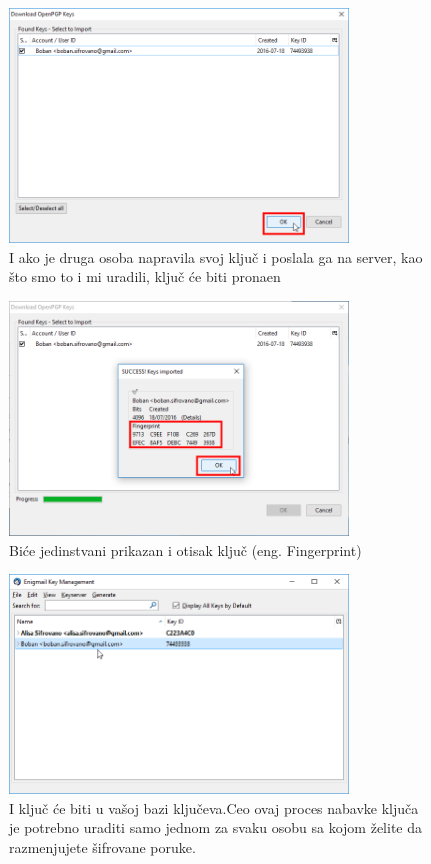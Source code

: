 \documentclass[a4paper,11pt]{article}
\begin{document}
\begin{figure}[!h]
	\begin{center}
		\includegraphics[width=9cm]{49_keymanagment_searchforkey.png}
		\caption{I ako je druga osoba napravila svoj klju\v{c} i poslala ga na server, kao \v{s}to smo to i mi uradili, klju\v{c} \'{c}e biti prona\dj{}en}
		\label{search_for_pubkey4}
	\end{center}
\end{figure}
\newpage
\begin{figure}[!h]
	\begin{center}
		\includegraphics[width=9cm]{50_keymanagment_searchforkey.png}
		\caption{Bi\'{c}e jedinstvani prikazan i otisak klju\v{c} (eng. Fingerprint)}
		\label{search_for_pubkey5}
	\end{center}
\end{figure}

\begin{figure}[!h]
	\begin{center}
		\includegraphics[width=9cm]{51_keymanagment_searchforkey.png}
		\caption{I klju\v{c} \'{c}e biti u va\v{s}oj bazi klju\v{c}eva.\newline Ceo ovaj proces nabavke klju\v{c}a je potrebno uraditi samo jednom za svaku osobu sa kojom \v{z}elite da razmenjujete \v{s}ifrovane poruke.}
		\label{search_for_pubkey6}
	\end{center}
\end{figure}
\newpage
\end{document}
